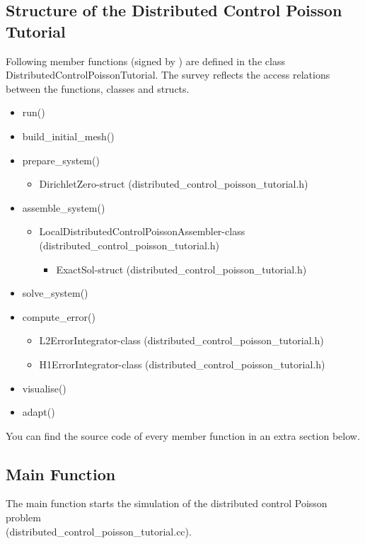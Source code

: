 \documentclass[a4paper, 11pt, twoside]{article}
\begin{document}
\subsection{Structure of the Distributed Control Poisson Tutorial}
Following member functions (signed by \textbullet) are defined in the class DistributedControlPoissonTutorial. The survey reflects the  access relations between the functions, classes and structs. 
 \begin{itemize}
    \item run()
    \item build\_initial\_mesh()
    \item prepare\_system()
    \begin{itemize}
	\item DirichletZero-struct (distributed\_control\_poisson\_tutorial.h)
    \end{itemize}
    \item assemble\_system()
    \begin{itemize}
	\item LocalDistributedControlPoissonAssembler-class (distributed\_control\_poisson\_tutorial.h)
        \begin{itemize}
	    \item ExactSol-struct (distributed\_control\_poisson\_tutorial.h)
	\end{itemize}    
    \end{itemize}    
    \item solve\_system()
    \item compute\_error()
    \begin{itemize}
	\item L2ErrorIntegrator-class (distributed\_control\_poisson\_tutorial.h)
	\item H1ErrorIntegrator-class (distributed\_control\_poisson\_tutorial.h)    
    \end{itemize}  
    \item visualise()
    \item adapt()
 \end{itemize} 
You can find the source code of every member function  in an extra section below. 


\subsection{Main Function}\label{sectionmain}
The main function starts the simulation of the distributed control Poisson problem \\
(distributed\_control\_poisson\_tutorial.cc).
\end{document}
